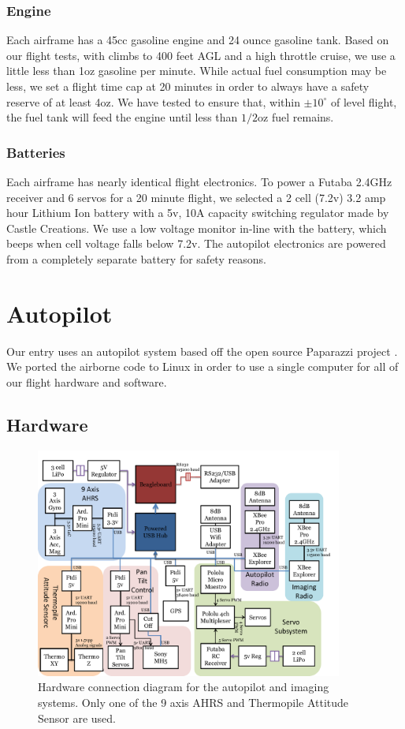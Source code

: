 \documentclass[pdftex,10pt,letter]{article}
\newcommand{\degrees}[1]
{
\begin{math}
#1^{\circ} 
\end{math}
}
\begin{document}
\subsubsection{Engine}

Each airframe has a 45cc gasoline engine and 24 ounce gasoline tank. Based on our flight tests, with climbs to 400 feet AGL and a high throttle cruise, we use a little less than 1oz gasoline per minute. While actual fuel consumption may be less, we set a flight time cap at 20 minutes in order to always have a safety reserve of at least 4oz. We have tested to ensure that, within \degrees{\pm10} of level flight, the fuel tank will feed the engine until less than $1/2$oz fuel remains.

\subsubsection{Batteries}

Each airframe has nearly identical flight electronics. To power a Futaba 2.4GHz receiver and 6 servos for a 20 minute flight, we selected a 2 cell (7.2v) 3.2 amp hour Lithium Ion battery with a 5v, 10A capacity switching regulator made by Castle Creations. We use a low voltage monitor in-line with the battery, which beeps when cell voltage falls below 7.2v. The autopilot electronics are powered from a completely separate battery for safety reasons.

\section{Autopilot}
Our entry uses an autopilot system based off the open source Paparazzi project \cite{paparazziweb}. We ported the airborne code to Linux in order to use a single computer for all of our flight hardware and software.

\subsection{Hardware}
\begin{figure}[t]
	\centering
	\includegraphics[width=0.9\textwidth]{../images/hardware_conn_diagram.pdf}
	\caption{Hardware connection diagram for the autopilot and imaging systems. Only one of the 9 axis AHRS and Thermopile Attitude Sensor are used.}
	\label{fig:hardware_conn_diagram}
\end{figure}
\end{document}

